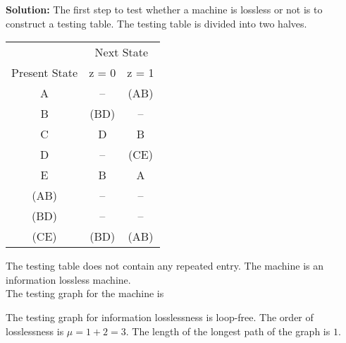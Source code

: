 \documentclass[a4,9pt]{beamer}
\begin{document}
\begin{frame}
\large{\textbf{Solution:}} The first step to test whether a machine is lossless or not is to construct a testing table. The testing table is divided
into two halves.

\pause
\begin{center}
  \begin{tabular}{ccc}
\hline

\hline

\hline

\hline
 & \multicolumn{2}{c}{Next State}\\
 \cline{2-3}
Present State & z = 0 & z = 1\\
\hline
 A &     --    &    (AB)    \\
 B &    (BD)   &     --     \\
 C &     D     &     B      \\
 D &     --    &    (CE)    \\
 E &     B     &     A      \\
\hline
(AB) &    --      &     --  \\
(BD) &    --      &     --  \\
(CE) &   (BD)     &    (AB) \\
\hline

\hline

\hline

\hline

  \end{tabular}
\end{center}
\end{frame}

\begin{frame}
\hspace*{0.1cm} The testing table does not contain any repeated entry. The machine is an information lossless machine.\\
\hspace*{0.1cm} The testing graph for the machine is

\pause
\begin{center}
\end{center}

\pause
\hspace*{0.1cm} The testing graph for information losslessness is loop-free. The order of losslessness is $\mu = 1 + 2 = 3$. The length of the longest path of the graph is $1$.
\end{frame}
\end{document}
